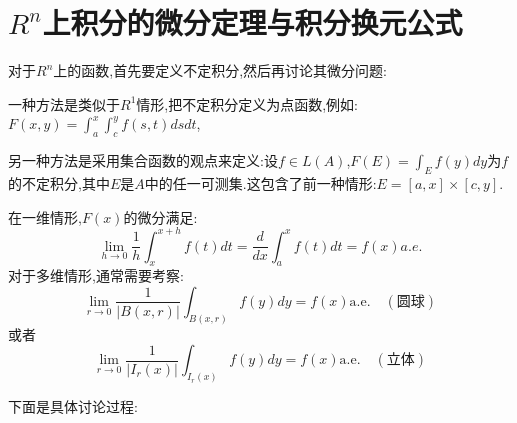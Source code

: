 \documentclass[12pt,a4paper,openany]{book}
\begin{document}
\section{$R^n$上积分的微分定理与积分换元公式}
对于$R^n$上的函数,首先要定义不定积分,然后再讨论其微分问题:

一种方法是类似于$R^1$情形,把不定积分定义为点函数,例如:$F(x,y)=\int_{a}^{x}{\int_{c}^{y}{f(s,t)dsdt}}$,

另一种方法是采用集合函数的观点来定义:设$f \in L(A)$,$F(E)=\int_{E}{f(y)dy}$为$f$的不定积分,其中$E$是$A$中的任一可测集.这包含了前一种情形:$E=[a,x] \times [c,y]$.

在一维情形,$F(x)$的微分满足:
\[
\lim_{h \rightarrow 0}{\frac{1}{h}\int_{x}^{x+h}{f(t)dt}}=\frac{d}{dx}\int_{a}^{x}{f(t)dt}=f(x) a.e.
\]
对于多维情形,通常需要考察:
\[
\lim_{r \rightarrow 0}{\frac{1}{|B(x,r)|}\int_{B(x,r)}{f(y)dy}} = f(x) \text{a.e.} \quad (\text{圆球})
\]
或者
\[
\lim_{r \rightarrow 0}{\frac{1}{|I_r(x)|}\int_{I_r(x)}{f(y)dy}} = f(x) \text{a.e.} \quad (\text{立体})
\]

下面是具体讨论过程:
\end{document}
